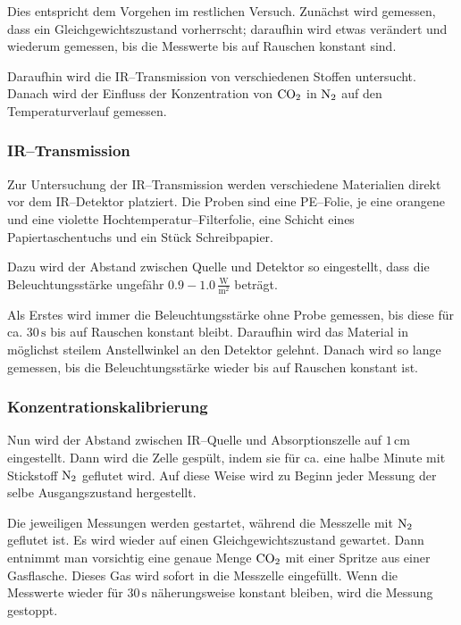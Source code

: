 \documentclass[12pt,a4paper]{scrartcl}
\numberwithin{equation}{section} %
\begin{document}
	Dies entspricht dem Vorgehen im restlichen Versuch. Zunächst wird gemessen, dass ein Gleichgewichtszustand vorherrscht; daraufhin wird etwas verändert und wiederum gemessen, bis die Messwerte bis auf Rauschen konstant sind.
	
	Daraufhin wird die IR--Transmission von verschiedenen Stoffen untersucht. Danach wird der Einfluss der Konzentration von $\ce{CO_2}$ in $\ce{N_2}$ auf den Temperaturverlauf gemessen.
	
	\subsubsection{IR--Transmission}
	\label{howto:IR--Transmission}
	
	Zur Untersuchung der IR--Transmission werden verschiedene Materialien direkt vor dem IR--Detektor platziert. Die Proben sind eine PE--Folie, je eine orangene und eine violette Hochtemperatur--Filterfolie, eine Schicht eines Papiertaschentuchs und ein Stück Schreibpapier.
	
	Dazu wird der Abstand zwischen Quelle und Detektor so eingestellt, dass die Beleuchtungsstärke ungefähr $0.9-1.0\mathrm{\,\frac{W}{m^2}}$ beträgt.
	
	Als Erstes wird immer die Beleuchtungsstärke ohne Probe gemessen, bis diese für ca. $30\mathrm{\,s}$ bis auf Rauschen konstant bleibt. Daraufhin wird das Material in möglichst steilem Anstellwinkel an den Detektor gelehnt. Danach wird so lange gemessen, bis die Beleuchtungsstärke wieder bis auf Rauschen konstant ist.
	
	\subsubsection{Konzentrationskalibrierung}
	\label{howto:Konzentrationskalibrierung}
	Nun wird der Abstand zwischen IR--Quelle und Absorptionszelle auf $1\mathrm{\,cm}$ eingestellt. Dann wird die Zelle gespült, indem sie für ca. eine halbe Minute mit Stickstoff $\ce{N_2}$ geflutet wird. Auf diese Weise wird zu Beginn jeder Messung der selbe Ausgangszustand hergestellt.
	
	Die jeweiligen Messungen werden gestartet, während die Messzelle mit $\ce{N_2}$ geflutet ist. Es wird wieder auf einen Gleichgewichtszustand gewartet. Dann entnimmt man vorsichtig eine genaue Menge $\ce{CO_2}$ mit einer Spritze aus einer Gasflasche. Dieses Gas wird sofort in die Messzelle eingefüllt. Wenn die Messwerte wieder für $30\mathrm{\,s}$ näherungsweise konstant bleiben, wird die Messung gestoppt.
	
\end{document}
